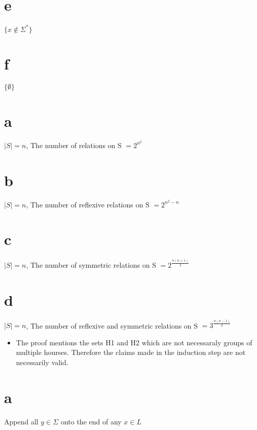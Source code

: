 \part{e} $\{ x \notin \Sigma^* \}$

\part{f} $\{ \emptyset \}$


\part{a} $|S| = n$, The number of relations on S $ = 2^{n^2}$ 

\part{b} $|S| = n$, The number of reflexive relations on S $ = 2^{n^{2}-n}$

\part{c} $|S| = n$, The number of symmetric relations on S $ = 2^{\frac{n(n+1)}{2}}$  

\part{d} $|S| = n$, The number of reflexive and symmetric relations on S $ = 3^{\frac{n(n-1)}{2}}$


\begin{center}
  \begin{itemize}
    \item The proof mentions the sets H1 and H2 which are not necessaraly groups of multiple hourses.
    Therefore the claims made in the induction step are not necessarily valid.
  \end{itemize}
\end{center}


\part{a} Append all $y \in \Sigma$ onto the end of any $x \in L$

